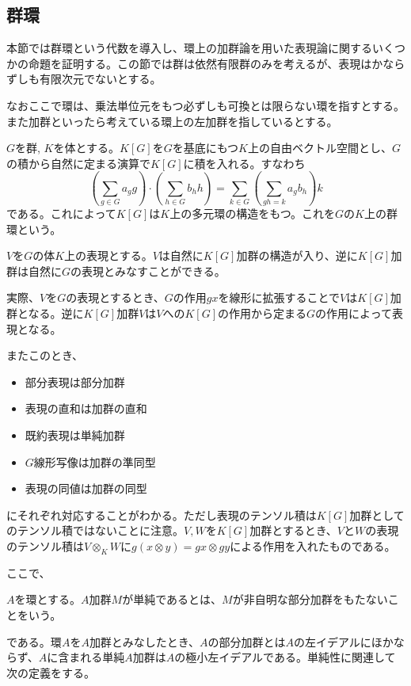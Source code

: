 \documentclass{ltjsarticle}
\begin{document}
\subsection{群環}

本節では群環という代数を導入し、環上の加群論を用いた表現論に関するいくつかの命題を証明する。この節では群は依然有限群のみを考えるが、表現はかならずしも有限次元でないとする。

なおここで環は、乗法単位元をもつ必ずしも可換とは限らない環を指すとする。また加群といったら考えている環上の左加群を指しているとする。

\begin{defin}
  $G$を群, $K$を体とする。$K[G]$を$G$を基底にもつ$K$上の自由ベクトル空間とし、$G$の積から自然に定まる演算で$K[G]$に積を入れる。すなわち
  \[
  \left(\sum_{g\in G}a_gg\right)\cdot\left(\sum_{h\in G}b_hh\right)  =\sum_{k \in G}\left(\sum_{gh=k}a_gb_h\right)k
  \]
  である。これによって$K[G]$は$K$上の多元環の構造をもつ。これを$G$の$K$上の群環という。
\end{defin}

$V$を$G$の体$K$上の表現とする。$V$は自然に$K[G]$加群の構造が入り、逆に$K[G]$加群は自然に$G$の表現とみなすことができる。

実際、$V$を$G$の表現とするとき、$G$の作用$gx$を線形に拡張することで$V$は$K[G]$加群となる。逆に$K[G]$加群$V$は$V$への$K[G]$の作用から定まる$G$の作用によって表現となる。

またこのとき、
\begin{itemize}
  \item 部分表現は部分加群
  \item 表現の直和は加群の直和
  \item 既約表現は単純加群
  \item $G$線形写像は加群の準同型
  \item 表現の同値は加群の同型
\end{itemize}
にそれぞれ対応することがわかる。ただし表現のテンソル積は$K[G]$加群としてのテンソル積ではないことに注意。$V,W$を$K[G]$加群とするとき、$V$と$W$の表現のテンソル積は$V\otimes_{K}W$に$g(x\otimes y)=gx\otimes gy$による作用を入れたものである。

ここで、

\begin{defin}
  $A$を環とする。$A$加群$M$が単純であるとは、$M$が非自明な部分加群をもたないことをいう。
\end{defin}

である。環$A$を$A$加群とみなしたとき、$A$の部分加群とは$A$の左イデアルにほかならず、$A$に含まれる単純$A$加群は$A$の極小左イデアルである。単純性に関連して次の定義をする。
\end{document}
